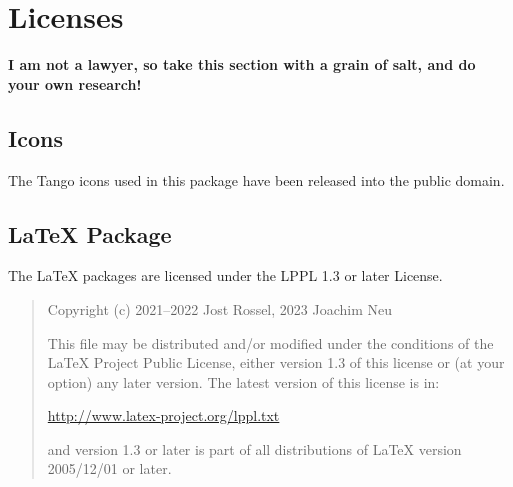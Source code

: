 \section{Licenses}

\textbf{I am not a lawyer, so take this section with a grain of salt, and do your own research!}

\subsection{Icons}

The Tango icons used in this package have been released into the public domain.

\subsection{LaTeX Package}

The LaTeX packages are licensed under the LPPL 1.3 or later License.

\begin{quote}
  Copyright (c) 2021--2022 Jost Rossel, 2023 Joachim Neu

  This file may be distributed and/or
  modified under the conditions of the LaTeX Project Public License,
  either version 1.3 of this license or (at your option) any later
  version. The latest version of this license is in:

  \url{http://www.latex-project.org/lppl.txt}

  and version 1.3 or later is part of all distributions of LaTeX version
  2005/12/01 or later.
\end{quote}
